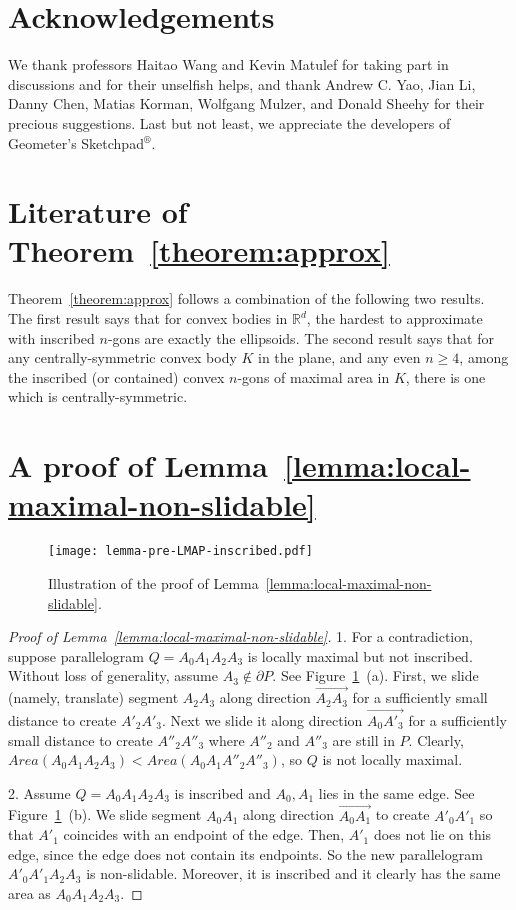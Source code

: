 \documentclass{ws-ijcga}
\begin{document}
\section*{Acknowledgements}
We thank professors Haitao Wang and Kevin Matulef for taking part in discussions and for their unselfish helps,
  and thank Andrew C. Yao, Jian Li, Danny Chen, Matias Korman, Wolfgang Mulzer, and Donald Sheehy for their precious suggestions.
Last but not least, we appreciate the developers of Geometer's Sketchpad${}^\circledR$.


\appendix

\section{Literature of Theorem~\ref{theorem:approx}}\label{sect:ratio}

Theorem~\ref{theorem:approx} follows a combination of the following two results.
The first result \cite{Math-Sas-CM39} says that for convex bodies in ${\mathbb R}^d$, the hardest to approximate with inscribed $n$-gons are exactly the ellipsoids.
The second result \cite{Math-Dow-AMS44} says that for any centrally-symmetric convex body $K$ in the plane, and any even $n \ge 4$,
among the inscribed (or contained) convex $n$-gons of maximal area in $K$, there is one which is centrally-symmetric.

\section{A proof of Lemma~\ref{lemma:local-maximal-non-slidable}}\label{sect:omit-slidable}

\begin{figure}[h]
  \centering \texttt{[image: lemma-pre-LMAP-inscribed.pdf]}
  \caption{Illustration of the proof of Lemma~\ref{lemma:local-maximal-non-slidable}.}\label{fig:LMAPs_fact}
\end{figure}

\begin{proof}[Proof of Lemma~\ref{lemma:local-maximal-non-slidable}]
1. For a contradiction, suppose parallelogram $Q=A_0A_1A_2A_3$ is locally maximal but not inscribed.
Without loss of generality, assume $A_3\notin \partial P$. See Figure~\ref{fig:LMAPs_fact}~(a).
First, we slide (namely, translate) segment $A_2A_3$ along direction $\overrightarrow{A_2A_3}$ for a sufficiently small distance to create $A'_2A'_3$.
Next we slide it along direction $\overrightarrow{A_0A'_3}$ for a sufficiently small distance to create $A''_2A''_3$ where
$A''_2$ and $A''_3$ are still in $P$.
Clearly, $Area(A_0A_1A_2A_3)<Area(A_0A_1A''_2A''_3)$, so $Q$ is not locally maximal.

2. Assume $Q=A_0A_1A_2A_3$ is inscribed and $A_0,A_1$ lies in the same edge. See Figure~\ref{fig:LMAPs_fact}~(b).
We slide segment $A_0A_1$ along direction $\overrightarrow{A_0A_1}$ to create $A'_0A'_1$ so that $A'_1$ coincides with an endpoint of the edge.
Then, $A'_1$ does not lie on this edge, since the edge does not contain its endpoints.
So the new parallelogram $A'_0A'_1A_2A_3$ is non-slidable. Moreover, it is inscribed and it clearly has the same area as $A_0A_1A_2A_3$.
 \end{proof}
\end{document}
